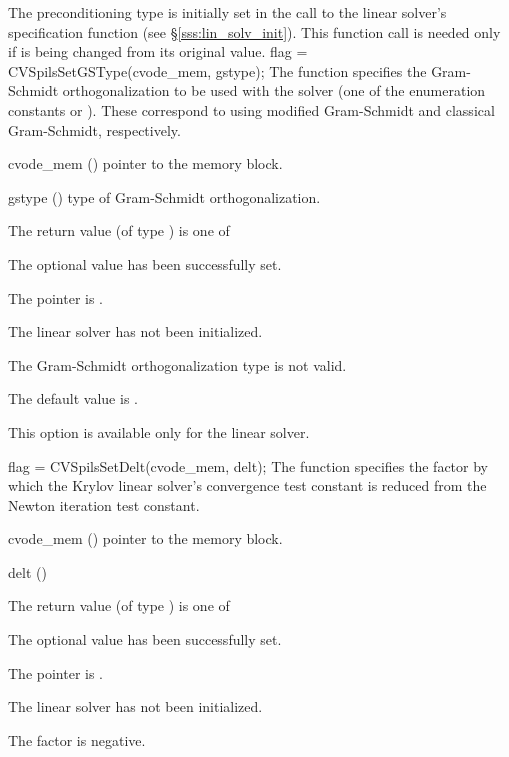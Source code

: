 {
  The preconditioning type is initially set in the call
  to the linear solver's specification function (see \S\ref{sss:lin_solv_init}). 
  This function call is needed only if  is being changed from its original 
  value.
}
{
  flag = CVSpilsSetGSType(cvode\_mem, gstype);
}
{
  The function  specifies the 
  Gram-Schmidt orthogonalization to be used with the {\cvspgmr} solver 
  (one of the enumeration constants 
  or ). These correspond to using modified Gram-Schmidt 
  and classical Gram-Schmidt, respectively. 
}
{
  \begin{args}
  \item[cvode\_mem] ()
    pointer to the {\cvode} memory block.
  \item[gstype] ()
    type of Gram-Schmidt orthogonalization.
  \end{args}
}
{
  The return value  (of type ) is one of
  \begin{args}
  \item[\Id{CVSPILS\_SUCCESS}] 
    The optional value has been successfully set.
  \item[\Id{CVSPILS\_MEM\_NULL}]
    The  pointer is .
  \item[\Id{CVSPILS\_LMEM\_NULL}]
    The {\cvspils} linear solver has not been initialized.
  \item[\Id{CVSPILS\_ILL\_INPUT}]
    The Gram-Schmidt orthogonalization type  is not valid.
  \end{args}
}
{
  The default value is .

  {\warn}This option is available only for the {\cvspgmr} linear solver.
}
{
  flag = CVSpilsSetDelt(cvode\_mem, delt);
}
{
  The function  specifies the factor by
  which the Krylov linear solver's convergence test constant is reduced
  from the Newton iteration test constant.
}
{
  \begin{args}
  \item[cvode\_mem] ()
    pointer to the {\cvode} memory block.
  \item[delt] ()

  \end{args}
}
{
  The return value  (of type ) is one of
  \begin{args}
  \item[\Id{CVSPILS\_SUCCESS}] 
    The optional value has been successfully set.
  \item[\Id{CVSPILS\_MEM\_NULL}]
    The  pointer is .
  \item[\Id{CVSPILS\_LMEM\_NULL}]
    The {\cvspils} linear solver has not been initialized.
  \item[\Id{CVSPILS\_ILL\_INPUT}]
    The factor  is negative.  
  \end{args}
}
